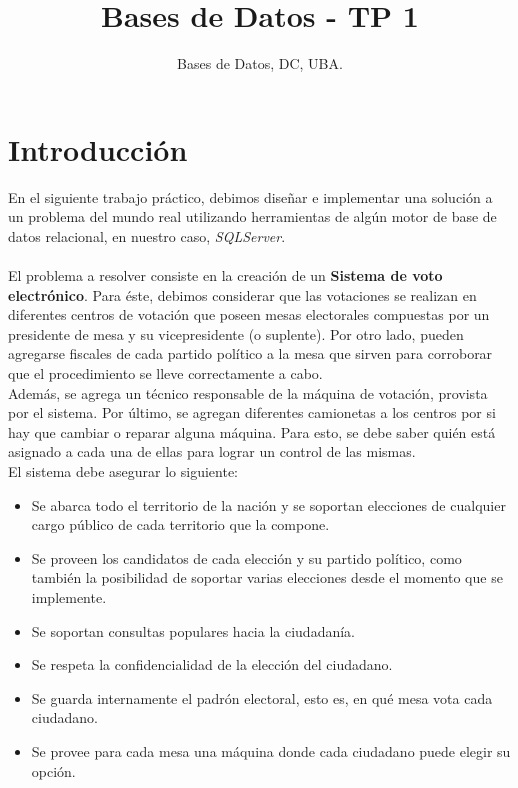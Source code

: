 \documentclass[10pt,a4paper]{article}
\title{Bases de Datos - TP 1}
\author{Bases de Datos, DC, UBA.}
\begin{document}



\maketitle

\tableofcontents

\newpage

\section{Introducción}

En el siguiente trabajo práctico, debimos diseñar e implementar una solución a un problema del mundo real utilizando herramientas de algún motor de base de datos relacional, en nuestro caso, \textit{SQLServer}.\\
\\
El problema a resolver consiste en la creación de un \textbf{Sistema de voto electrónico}. Para éste, debimos considerar que las votaciones se realizan en diferentes centros de votación que poseen mesas electorales compuestas por un presidente de mesa y su vicepresidente (o suplente). Por otro lado, pueden agregarse fiscales de cada partido político a la mesa que sirven para corroborar que el procedimiento se lleve correctamente a cabo.\\ Además, se agrega un técnico responsable de la máquina de votación, provista por el sistema. Por último, se agregan diferentes camionetas a los centros por si hay que cambiar o reparar alguna máquina. Para esto, se debe saber quién está asignado a cada una de ellas para lograr un control de las mismas.\\

El sistema debe asegurar lo siguiente:
\begin{itemize}
\item Se abarca todo el territorio de la nación y se soportan elecciones de cualquier cargo público de cada territorio que la compone. 
\item Se proveen los candidatos de cada elección y su partido político, como también la posibilidad de soportar varias elecciones desde el momento que se implemente.
\item Se soportan consultas populares hacia la ciudadanía.
\item Se respeta la confidencialidad de la elección del ciudadano.
\item Se guarda internamente el padrón electoral, esto es, en qué mesa vota cada ciudadano.
\item Se provee para cada mesa una máquina donde cada ciudadano puede elegir su opción.
\end{itemize}
\end{document}
